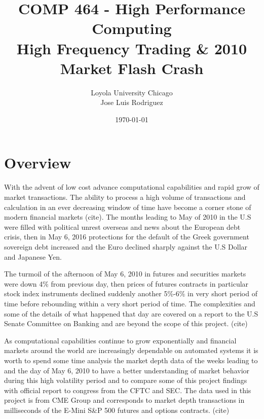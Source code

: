 \documentclass[12pt]{article} %
\title{COMP 464 - High Performance Computing \\ High Frequency Trading \& 2010 Market Flash Crash} %
\author{
Loyola University Chicago \\
Jose Luis Rodriguez 
} %
\date{\today} %
\begin{document}
\maketitle

\thispagestyle{fancy}


\section{Overview}

With the advent of low cost advance computational capabilities and rapid grow of market transactions. The ability to process a high volume of transactions and calculation in an ever decreasing window of time have become a corner stone of modern financial markets (cite). The months leading to May of 2010 in the U.S were filled with political unrest overseas and news about the European debt crisis, then in May 6, 2016 protections for the default of the Greek government sovereign debt increased and the Euro declined sharply against the U.S Dollar and Japanese Yen. 

The turmoil of the afternoon of May 6, 2010 in futures and securities markets were down 4\% from previous day, then prices of futures contracts in particular stock index instruments declined suddenly another 5\%-6\% in very short period of time before rebounding within a very short period of time. The complexities and some of the details of what happened that day are covered on a report to the U.S Senate Committee on Banking and are beyond the scope of this project. (cite)

\newpage

As computational capabilities continue to grow exponentially and financial markets around the world are increasingly dependable on automated systems it is worth to spend some time analysis the market depth data of the weeks leading to and the day of May 6, 2010 to have a better understanding of market behavior during this high volatility period and to compare some of this project findings with official report to congress from the CFTC and SEC. The data used in this project is from CME Group and corresponds to market depth transactions in milliseconds of the E-Mini S\&P 500 futures and options contracts. (cite)

\end{document}
